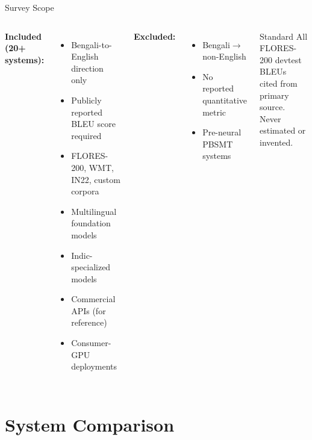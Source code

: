 \documentclass[aspectratio=169,10pt]{beamer}
\begin{document}
\begin{frame}{Survey Scope}
  \begin{columns}
    \textbf{Included (20+ systems):}
    \begin{itemize}
      \item Bengali-to-English direction only
      \item Publicly reported BLEU score required
      \item FLORES-200, WMT, IN22, custom corpora
      \item Multilingual foundation models
      \item Indic-specialized models
      \item Commercial APIs (for reference)
      \item Consumer-GPU deployments
    \end{itemize}

    \textbf{Excluded:}
    \begin{itemize}
      \item Bengali$\to$non-English
      \item No reported quantitative metric
      \item Pre-neural PBSMT systems
    \end{itemize}
    \vspace{0.3cm}
    \begin{block}{Standard}
      All FLORES-200 devtest BLEUs\\
      cited from primary source.\\
      Never estimated or invented.
    \end{block}
  \end{columns}
\end{frame}

\section{System Comparison}
\end{document}
